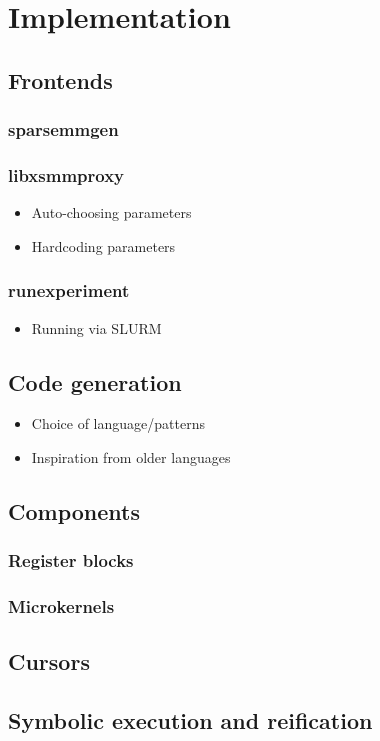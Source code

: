 \chapter{Implementation}
\label{chapter:implementation}

\section{Frontends}
\subsection{sparsemmgen}
\subsection{libxsmmproxy}
\begin{itemize}
	\item Auto-choosing parameters
	\item Hardcoding parameters
\end{itemize}
\subsection{runexperiment}
\begin{itemize}
	\item Running via SLURM
\end{itemize}


\section{Code generation}
\begin{itemize}
	\item Choice of language/patterns
	\item Inspiration from older languages
\end{itemize}

\section{Components}
\subsection{Register blocks}
\subsection{Microkernels}

\section{Cursors}

\section{Symbolic execution and reification}

